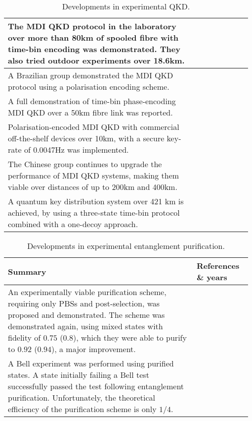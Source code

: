 \begin{table*}[!htbp]
\begin{tabular}{|p{0.755\linewidth}|p{0.22\linewidth}|}
The MDI QKD protocol in the laboratory over more than 80km of spooled fibre with time-bin encoding was demonstrated. They also tried outdoor experiments over 18.6km.&\cite{bib:PRL_111_130501}\\
\hline
A Brazilian group demonstrated the MDI QKD protocol using a polarisation encoding scheme.&\cite{bib:PRA_88_052303}\\
\hline
A full demonstration of time-bin phase-encoding MDI QKD over a 50km fibre link was reported.&\cite{bib:PRL_111_130502}\\
\hline
Polarisation-encoded MDI QKD with commercial off-the-shelf devices over 10km, with a secure key-rate of 0.0047Hz was implemented.&\cite{bib:PRL_112_190503}\\
\hline
The Chinese group continues to upgrade the performance of MDI QKD systems, making them viable over distances of up to 200km and 400km.&\cite{bib:PRL_113_190501, bib:yin2016measurement}
\\
\hline
A quantum key distribution system over 421 km is achieved, by using a three-state time-bin protocol combined with a one-decoy approach. &\cite{bib:boaron2018secure}
\\
\hline
\end{tabular}
\captionspacetab \caption{Developments in experimental QKD.} \label{tab:QKD_table}
\end{table*}

\begin{table*}[!htbp]
\begin{tabular}{|p{0.755\linewidth}|p{0.22\linewidth}|}
	\hline
	\textbf{Summary} & \textbf{References \& years} \\	\hline \hline
	An experimentally viable purification scheme, requiring only PBSs and post-selection, was proposed and demonstrated. The scheme was demonstrated again, using mixed states with fidelity of $0.75$ ($0.8$), which they were able to purify to $0.92$ ($0.94$), a major improvement. & \cite{bib:Pan01, bib:Pan03} \\
	\hline
	A Bell experiment was performed using purified states. A state initially failing a Bell test successfully passed the test following entanglement purification. Unfortunately, the theoretical efficiency of the purification scheme is only $1/4$. & \cite{bib:PRL_94_040504, bib:Pan01} \\
	\hline
\end{tabular}
\captionspacetab \caption{Developments in experimental entanglement purification.} \label{tab:ent_pur}
\end{table*}

